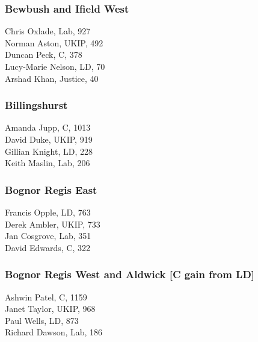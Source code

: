 \documentclass[a4paper,openany,10pt]{book}
\begin{document}
\subsubsection*{Bewbush and Ifield West}



Chris Oxlade, Lab, 927\\
Norman Aston, UKIP, 492\\
Duncan Peck, C, 378\\
Lucy-Marie Nelson, LD, 70\\
Arshad Khan, Justice, 40\\


\subsubsection*{Billingshurst}



Amanda Jupp, C, 1013\\
David Duke, UKIP, 919\\
Gillian Knight, LD, 228\\
Keith Maslin, Lab, 206\\


\subsubsection*{Bognor Regis East}



Francis Opple, LD, 763\\
Derek Ambler, UKIP, 733\\
Jan Cosgrove, Lab, 351\\
David Edwards, C, 322\\


\subsubsection*{Bognor Regis West and Aldwick \hspace*{\fill}\nolinebreak[1]%
\enspace\hspace*{\fill}
[C gain from LD]}



Ashwin Patel, C, 1159\\
Janet Taylor, UKIP, 968\\
Paul Wells, LD, 873\\
Richard Dawson, Lab, 186\\
\end{document}
